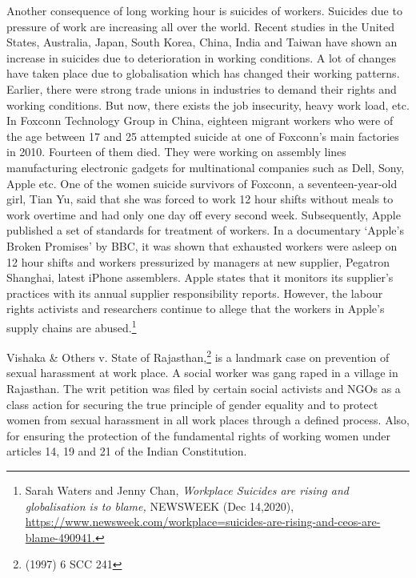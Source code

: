 \begin{multicols}{2}
\noi
Another consequence of long working hour is suicides of workers. Suicides due to pressure
of work are increasing all over the world. Recent studies in the United States, Australia,
Japan, South Korea, China, India and Taiwan have shown an increase in suicides due to
deterioration in working conditions. A lot of changes have taken place due to globalisation
which has changed their working patterns. Earlier, there were strong trade unions in
industries to demand their rights and working conditions. But now, there exists the job
insecurity, heavy work load, etc. In Foxconn Technology Group in China, eighteen migrant 
workers who were of the age between 17 and 25 attempted suicide at one of Foxconn’s main
factories in 2010. Fourteen of them died. They were working on assembly lines
manufacturing electronic gadgets for multinational companies such as Dell, Sony, Apple etc.
One of the women suicide survivors of Foxconn, a seventeen-year-old girl, Tian Yu, said that
she was forced to work 12 hour shifts without meals to work overtime and had only one day
off every second week. Subsequently, Apple published a set of standards for treatment of
workers. In a documentary ‘Apple’s Broken Promises’ by BBC, it was shown that exhausted
workers were asleep on 12 hour shifts and workers pressurized by managers at new supplier,
Pegatron Shanghai, latest iPhone assemblers. Apple states that it monitors its supplier’s
practices with its annual supplier responsibility reports. However, the labour rights activists
and researchers continue to allege that the workers in Apple’s supply chains are abused.\footnote{Sarah Waters and Jenny Chan, \textit{Workplace Suicides are rising and globalisation is to blame,} NEWSWEEK
(Dec 14,2020), \url{https://www.newsweek.com/workplace=suicides-are-rising-and-ceos-are-blame-490941.}}



\noi
Vishaka \& Others v. State of Rajasthan,\footnote{(1997) 6 SCC 241} is a landmark case on prevention of sexual
harassment at work place. A social worker was gang raped in a village in Rajasthan. The writ
petition was filed by certain social activists and NGOs as a class action for securing the true
principle of gender equality and to protect women from sexual harassment in all work places
through a defined process. Also, for ensuring the protection of the fundamental rights of
working women under articles 14, 19 and 21 of the Indian Constitution.


\end{multicols}
